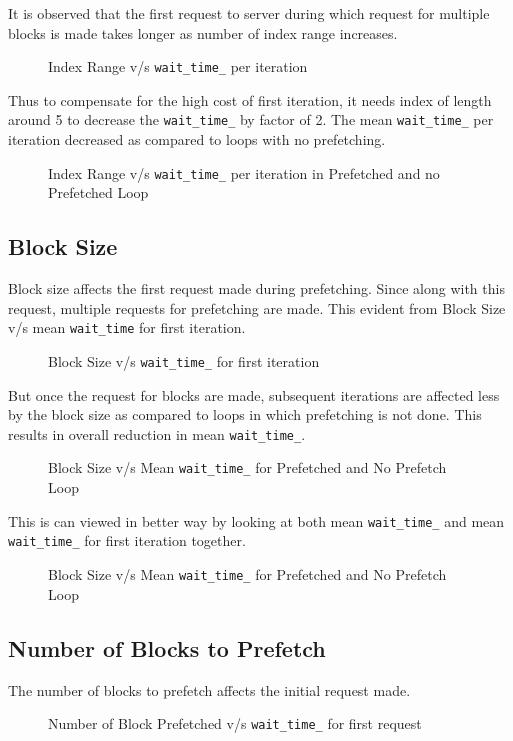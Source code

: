 It is observed that the first request to server during which request for multiple
blocks is made takes longer as number of index range increases.
\begin{figure}[h]
  
  \caption{Index Range v/s \texttt{wait\_time\_} per iteration}
\end{figure}

Thus to compensate for the high cost of first iteration, it needs index of length
around 5 to decrease the \texttt{wait\_time\_} by factor of 2. The mean \texttt{wait\_time\_}
per iteration decreased as compared to loops with no prefetching.
\begin{figure}[h]
  
  \caption{Index Range v/s \texttt{wait\_time\_} per iteration in Prefetched and no Prefetched Loop}
\end{figure}

\subsection{Block Size}
Block size affects the first request made during prefetching. Since along with this
request, multiple requests for prefetching are made. This evident from Block Size
v/s mean \texttt{wait\_time} for first iteration.
\begin{figure}[h]
  
  \caption{Block Size v/s \texttt{wait\_time\_} for first iteration}
\end{figure}

But once the request for blocks are made, subsequent iterations are affected less
by the block size as compared to loops in which prefetching is not done. This results
in overall reduction in mean \texttt{wait\_time\_}.
\begin{figure}[h]
  
  \caption{Block Size v/s Mean \texttt{wait\_time\_} for Prefetched and No Prefetch Loop}
\end{figure}

This is can viewed in better way by looking at both mean \texttt{wait\_time\_} and
mean \texttt{wait\_time\_} for first iteration together.
\begin{figure}[h]
  
  \caption{Block Size v/s Mean \texttt{wait\_time\_} for Prefetched and No Prefetch Loop}
\end{figure}

\subsection{Number of Blocks to Prefetch}
The number of blocks to prefetch affects the initial request made.
\begin{figure}[h]
  
  \caption{Number of Block Prefetched v/s \texttt{wait\_time\_} for first request}
\end{figure}

